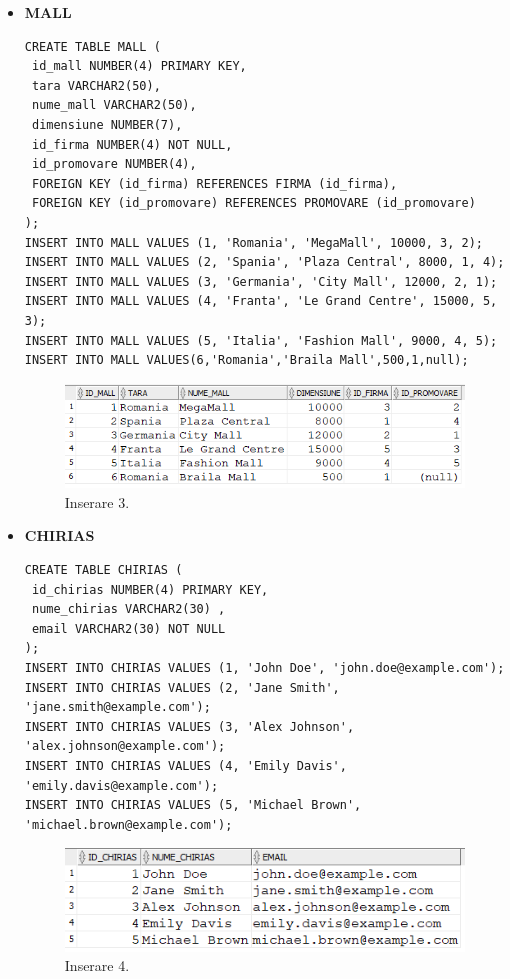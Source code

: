 \begin{itemize}
    \item \textbf{MALL}
    \vspace{0.2cm}
    \begin{lstlisting}
CREATE TABLE MALL (
 id_mall NUMBER(4) PRIMARY KEY,
 tara VARCHAR2(50),
 nume_mall VARCHAR2(50),
 dimensiune NUMBER(7),
 id_firma NUMBER(4) NOT NULL,
 id_promovare NUMBER(4),
 FOREIGN KEY (id_firma) REFERENCES FIRMA (id_firma),
 FOREIGN KEY (id_promovare) REFERENCES PROMOVARE (id_promovare)
);
INSERT INTO MALL VALUES (1, 'Romania', 'MegaMall', 10000, 3, 2);
INSERT INTO MALL VALUES (2, 'Spania', 'Plaza Central', 8000, 1, 4);
INSERT INTO MALL VALUES (3, 'Germania', 'City Mall', 12000, 2, 1);
INSERT INTO MALL VALUES (4, 'Franta', 'Le Grand Centre', 15000, 5, 3);
INSERT INTO MALL VALUES (5, 'Italia', 'Fashion Mall', 9000, 4, 5);
INSERT INTO MALL VALUES(6,'Romania','Braila Mall',500,1,null);
    \end{lstlisting}
    \vspace{0.2cm}
    \begin{figure}[h]
      \centerline{\includegraphics{images/inserare3.png}}
      \caption{ Inserare 3.}
    \end{figure}
    \vspace{0.5cm}

    \item \textbf{CHIRIAS}
    \vspace{0.2cm}
    \begin{lstlisting}
CREATE TABLE CHIRIAS (
 id_chirias NUMBER(4) PRIMARY KEY,
 nume_chirias VARCHAR2(30) ,
 email VARCHAR2(30) NOT NULL
);
INSERT INTO CHIRIAS VALUES (1, 'John Doe', 'john.doe@example.com');
INSERT INTO CHIRIAS VALUES (2, 'Jane Smith', 'jane.smith@example.com');
INSERT INTO CHIRIAS VALUES (3, 'Alex Johnson', 'alex.johnson@example.com');
INSERT INTO CHIRIAS VALUES (4, 'Emily Davis', 'emily.davis@example.com');
INSERT INTO CHIRIAS VALUES (5, 'Michael Brown', 'michael.brown@example.com');
    \end{lstlisting}
    \vspace{0.2cm}
    \begin{figure}[h]
      \centerline{\includegraphics{images/inserare4.png}}
      \caption{ Inserare 4.}
    \end{figure}
    \vspace{0.5cm}


\end{itemize}
